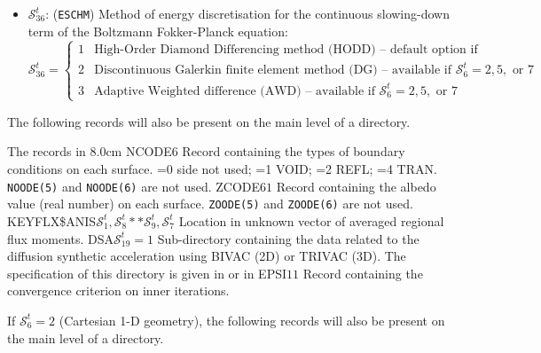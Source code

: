 \begin{itemize}
\item $\mathcal{S}^{t}_{36}$: ({\tt ESCHM}) Method of energy discretisation for the continuous slowing-down term of the Boltzmann Fokker-Planck equation:
\begin{displaymath}
\mathcal{S}^{t}_{36} = \left\{
\begin{array}{rl}
 1 & \textrm{High-Order Diamond Differencing method (HODD) -- default option if unspecified} \\
 2 & \textrm{Discontinuous Galerkin finite element method (DG) -- available if $\mathcal{S}^{t}_{6} = 2, 5,$ or $7$}\\
 3 & \textrm{Adaptive Weighted difference (AWD) -- available if $\mathcal{S}^{t}_{6} = 2, 5,$ or $7$}
\end{array} \right.
\end{displaymath}

\end{itemize}

The following records will also be present on the main level of a 
directory.
\begin{DescriptionEnregistrement}{The  records in
}{8.0cm}
\IntEnr
  {NCODE}{$6$}
  {Record containing the types of boundary conditions on each surface. =0 side
   not used; =1 VOID; =2 REFL; =4 TRAN. {\tt NOODE(5)} and {\tt NOODE(6)} are not used.} 
\RealEnr
  {ZCODE}{$6$}{$1$}
  {Record containing the albedo value (real number) on each surface. {\tt ZOODE(5)}
   and {\tt ZOODE(6)} are not used.} 
\IntEnr
  {KEYFLX\$ANIS}{$\mathcal{S}^t_1,\mathcal{S}^{t}_{8}**\mathcal{S}^{t}_{9},\mathcal{S}^{t}_{7}$}
  {Location in unknown vector of averaged regional flux moments.} 
\OptDirEnr
  {DSA}{$\mathcal{S}^{t}_{19}= 1$}
  {Sub-directory containing the data related to the diffusion synthetic acceleration using BIVAC (2D) or TRIVAC (3D).
  The specification of this directory is given in  or in  } 
\RealEnr
  {EPSI}{$1$}{$1$}
  {Record containing the convergence criterion on inner iterations.}

\end{DescriptionEnregistrement}

If $\mathcal{S}^{t}_{6}=2$ (Cartesian 1-D geometry), the following records will also be present on the main level of a 
directory.

